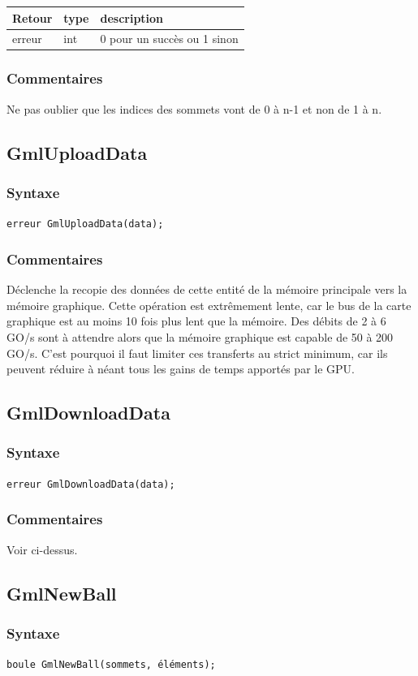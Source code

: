 \documentclass[a4paper,12pt]{article}
\begin{document}
\begin{tabular}{|m{2cm}|m{1.5cm}|m{10.5cm}|}
\hline
Retour     & type   & description \\
\hline
erreur     & int    & 0 pour un succès ou 1 sinon \\
\hline
\end{tabular}
\subsubsection*{Commentaires}
Ne pas oublier que les indices des sommets vont de 0 à n-1 et non de 1 à n.


\subsection{GmlUploadData}
\subsubsection*{Syntaxe}
{\tt erreur GmlUploadData(data);}
\subsubsection*{Commentaires}
Déclenche la recopie des données de cette entité de la mémoire principale vers la mémoire graphique. Cette opération est extrêmement lente, car le bus de la carte graphique est au moins 10 fois plus lent que la mémoire. Des débits de 2 à 6 GO/s sont à attendre alors que la mémoire graphique est capable de 50 à 200 GO/s. C'est pourquoi il faut limiter ces transferts au strict minimum, car ils peuvent réduire à néant tous les gains de temps apportés par le GPU.


\subsection{GmlDownloadData}
\subsubsection*{Syntaxe}
{\tt erreur GmlDownloadData(data);}
\subsubsection*{Commentaires}
Voir ci-dessus.


\subsection{GmlNewBall}
\subsubsection*{Syntaxe}
{\tt boule GmlNewBall(sommets, éléments);}
\end{document}
